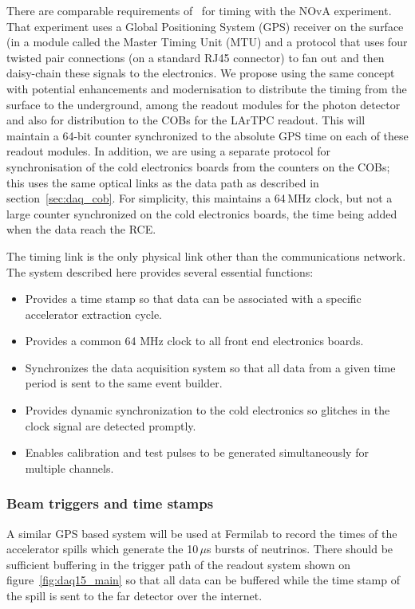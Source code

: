 There are comparable requirements of \LBNE\ for timing with the NOvA
experiment.  That experiment uses a Global Positioning System (GPS)
receiver on the surface (in a module called the Master Timing Unit
(MTU) and a protocol that uses four twisted pair connections (on a
standard RJ45 connector) to fan out and then daisy-chain these signals
to the electronics.  We propose using the same concept with potential
enhancements and modernisation to distribute the timing from the
surface to the underground, among the readout modules for the photon
detector and also for distribution to the COBs for the LArTPC readout.
This will maintain a 64-bit counter synchronized to the absolute GPS
time on each of these readout modules.  In addition, we are using a
separate protocol for synchronisation of the cold electronics
boards from the counters on the COBs; this uses the same optical links
as the data path as described in section~\ref{sec:daq_cob}.  For
simplicity, this maintains a 64\,MHz clock, but not a large counter
synchronized on the cold electronics boards, the time being added when
the data reach the RCE.

The timing link is the only physical link other than the
communications network.  The system described here
provides several essential functions:
\begin{itemize}
\item Provides a time stamp so that data can be associated with a
  specific accelerator extraction cycle.
\item Provides a common 64 MHz clock to all front end electronics
  boards.
\item Synchronizes the data acquisition system so that all data from a
  given time period is sent to the same event builder.
\item Provides dynamic synchronization to the cold electronics so
  glitches in the clock signal are detected promptly.
\item Enables calibration and test pulses to be generated
  simultaneously for multiple channels.
\end{itemize}

\subsubsection{Beam triggers and time stamps}

A similar GPS based system will be used at Fermilab to record the times
of the accelerator spills which generate the 10\,$\mu$s bursts of
neutrinos.  There should be sufficient buffering in the trigger path
of the readout system shown on figure~\ref{fig:daq15_main} so that all
data can be buffered while the time stamp of the spill is
sent to the far detector over the internet.  

